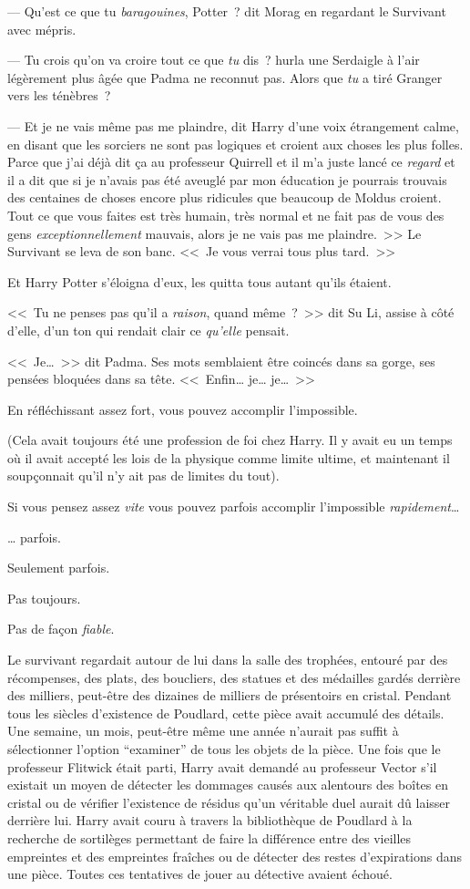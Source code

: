 --- Qu'est ce que tu \emph{baragouines}, Potter~? dit Morag en regardant le Survivant avec mépris.

--- Tu crois qu'on va croire tout ce que \emph{tu} dis~? hurla une Serdaigle à l'air légèrement plus âgée que Padma ne reconnut pas. Alors que \emph{tu} a tiré Granger vers les ténèbres~?

--- Et je ne vais même pas me plaindre, dit Harry d'une voix étrangement calme, en disant que les sorciers ne sont pas logiques et croient aux choses les plus folles. Parce que j'ai déjà dit ça au professeur Quirrell et il m'a juste lancé ce \emph{regard} et il a dit que si je n'avais pas été aveuglé par mon éducation je pourrais trouvais des centaines de choses encore plus ridicules que beaucoup de Moldus croient. Tout ce que vous faites est très humain, très normal et ne fait pas de vous des gens \emph{exceptionnellement} mauvais, alors je ne vais pas me plaindre.~>> Le Survivant se leva de son banc. <<~Je vous verrai tous plus tard.~>>

Et Harry Potter s'éloigna d'eux, les quitta tous autant qu'ils étaient.

<<~Tu ne penses pas qu'il a \emph{raison}, quand même~?~>> dit Su Li, assise à côté d'elle, d'un ton qui rendait clair ce \emph{qu'elle} pensait.

<<~Je…~>> dit Padma. Ses mots semblaient être coincés dans sa gorge, ses pensées bloquées dans sa tête. <<~Enfin… je… je…~>>

\later

En réfléchissant assez fort, vous pouvez accomplir l'impossible.

(Cela avait toujours été une profession de foi chez Harry. Il y avait eu un temps où il avait accepté les lois de la physique comme limite ultime, et maintenant il soupçonnait qu'il n'y ait pas de limites du tout).

Si vous pensez assez \emph{vite} vous pouvez parfois accomplir l'impossible \emph{rapidement}…

… parfois.

Seulement parfois.

Pas toujours.

Pas de façon \emph{fiable}.

Le survivant regardait autour de lui dans la salle des trophées, entouré par des récompenses, des plats, des boucliers, des statues et des médailles gardés derrière des milliers, peut-être des dizaines de milliers de présentoirs en cristal. Pendant tous les siècles d'existence de Poudlard, cette pièce avait accumulé des détails. Une semaine, un mois, peut-être même une année n'aurait pas suffit à sélectionner l'option “examiner” de tous les objets de la pièce. Une fois que le professeur Flitwick était parti, Harry avait demandé au professeur Vector s'il existait un moyen de détecter les dommages causés aux alentours des boîtes en cristal ou de vérifier l'existence de résidus qu'un véritable duel aurait dû laisser derrière lui. Harry avait couru à travers la bibliothèque de Poudlard à la recherche de sortilèges permettant de faire la différence entre des vieilles empreintes et des empreintes fraîches ou de détecter des restes d'expirations dans une pièce. Toutes ces tentatives de jouer au détective avaient échoué.

